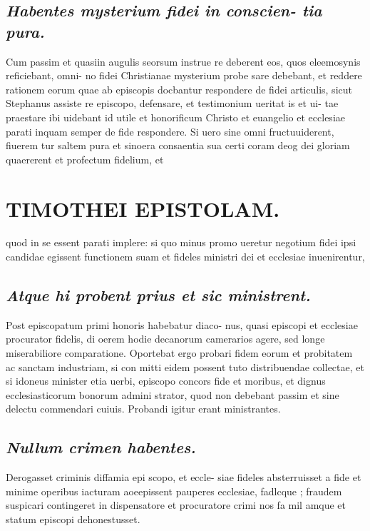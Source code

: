 \documentclass{article}
\begin{document}
\begin{pages}
\subsection*{\textit{Habentes mysterium fidei in conscien- tia pura. }}\pstart Cum passim et quasiin augulis seorsum instrue re deberent eos, quos eleemosynis reficiebant, omni- no fidei Christianae mysterium probe sare debebant, et reddere rationem eorum quae ab episcopis docbantur respondere de fidei articulis, sicut Stephanus assiste re episcopo, defensare, et testimonium ueritat is et ui- tae praestare ibi uidebant id utile et honorificum Christo et euangelio et ecclesiae parati inquam semper de fide respondere. Si uero sine omni fructuuiderent, fiuerem tur saltem pura et sinoera consaentia sua certi coram deog dei gloriam quaererent et profectum fidelium, et  \pend
\section*{TIMOTHEI EPISTOLAM. }
\marginpar{[ p.83 ]}\pstart quod in se essent parati implere: si quo minus promo ueretur negotium fidei ipsi candidae egissent functionem suam et fideles ministri dei et ecclesiae inuenirentur,  \pend
{}
{}
\subsection*{\textit{Atque hi probent prius et sic ministrent. }}\pstart Post episcopatum primi honoris habebatur diaco- nus, quasi episcopi et ecclesiae procurator fidelis, di oerem hodie decanorum camerarios agere, sed longe miserabiliore comparatione. Oportebat ergo probari fidem eorum et probitatem ac sanctam industriam, si con mitti eidem possent tuto distribuendae collectae, et si idoneus minister etia uerbi, episcopo concors fide et moribus, et dignus ecclesiasticorum bonorum admini strator, quod non debebant passim et sine delectu commendari cuiuis. Probandi igitur erant ministrantes.  \pend
{}
{}
\subsection*{\textit{Nullum crimen habentes. }}\pstart Derogasset criminis diffamia epi scopo, et eccle- siae fideles absterruisset a fide et minime operibus iacturam aoeepissent pauperes ecclesiae, fadlcque ; fraudem suspicari contingeret in dispensatore et procuratore crimi nos fa mil amque et statum episcopi dehonestusset.  \pend
{}
{}

\end{pages}
\end{document}
